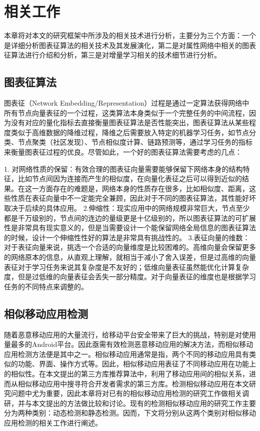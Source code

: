 \chapter{相关工作}
本章将对本文的研究框架中所涉及的相关技术进行分析，主要分为三个方面：一个是详细分析图表征算法的相关技术及其发展演化，第二是对属性网络中相关的图表征算法进行介绍和分析，第三是对增量学习相关的技术细节进行分析。



\section{图表征算法 }
图表征（Network Embedding/Representation）过程是通过一定算法获得网络中所有节点向量表征的一个过程，这类算法本身类似于一个完整任务的中间流程，因为没有对应的量化指标去直接衡量图表征算法是否性能突出，图表征算法从某些程度类似于高维数据的降维过程，降维之后需要放入特定的机器学习任务，如节点分类、节点聚类（社区发现）、节点相似度计算、链路预测等，通过学习任务的指标来衡量图表征过程的优良。尽管如此，一个好的图表征算法需要考虑的几点：

1. 对网络性质的保留：有效合理的图表征向量需要能够保留下网络本身的结构特征，比如节点间因为连接而产生的相似度，在向量化表征之后可以得到近似的结果。在这一方面存在的难题是，网络本身的性质存在很多，比如相似度、距离，这些性质在表征向量中不一定能完全兼顾，因此对于不同的图表征算法，其性能好坏取决于后续的具体应用。
2.伸缩性：现实应用中的网络规模非常巨大，节点至少都是千万级别的，节点间的连边的量级更是十亿级别的，所以图表征算法的可扩展性是非常具有现实意义的，但是当需要设计一个能保留网络全局信息的图表征算法的时候，设计一个伸缩性性好的算法是非常具有挑战性的。
3.表征向量的维数：对于表征向量来说，挑选一个合适的向量维度是比较困难的。高维向量会保留更多的网络原本的信息，从直观上理解，就相当于减小了舍入误差，但是过高维的向量表征对于学习任务来说其复杂度是不友好的；低维向量表征虽然能优化计算复杂度，但是过低维的向量表征会丢失一部分精度。对于向量表征的维度也是根据学习任务的不同特点来调整的。




\section{相似移动应用检测}
随着恶意移动应用的大量流行，给移动平台安全带来了巨大的挑战，特别是对使用量最多的Android平台\cite{huang2014asdroid}。因此亟需有效检测恶意移动应用的解决方法，而相似移动应用检测方法便是其中之一。相似移动应用通常是指，两个不同的移动应用具有类似的功能、界面、操作方式等。因此，相似移动应用表征了不同移动应用在功能上的相似性。在本文提出的第三方库推荐算法中，利用了移动应用间的相似关系，进而从相似移动应用中搜寻符合开发者需求的第三方库。检测相似移动应用在本文研究问题中尤为重要，因此本章将对已有的相似移动应用检测的研究工作做相关调研，并与本文提出的方法做比较和讨论。现有的检测相似移动应用的研究工作主要分为两种类别：动态检测和静态检测。因而，下文将分别从这两个类别对相似移动应用检测的相关工作进行阐述。

